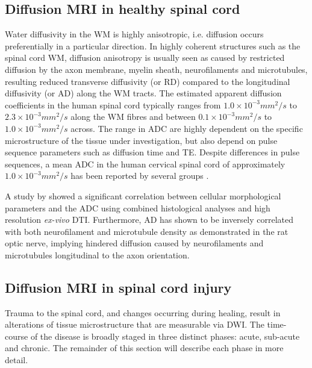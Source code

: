 \subsection{Diffusion MRI in healthy spinal cord}
Water diffusivity in the \gls{WM} is highly anisotropic, i.e. diffusion occurs preferentially in a particular direction. In highly coherent structures such as the spinal cord WM, diffusion anisotropy is usually seen as caused by restricted diffusion by the axon membrane, myelin sheath, neurofilaments and microtubules, resulting reduced transverse diffusivity (or \gls{RD}) compared to the longitudinal diffusivity (or \gls{AD}) along the \gls{WM} tracts. The estimated apparent diffusion coefficients in the human spinal cord typically ranges from $1.0 \times 10^{-3} mm^2/s$ to $2.3 \times 10^{-3} mm^{2}/s$ along the \gls{WM} fibres and between  $0.1 \times 10^{-3} mm^2/s$ to $1.0 \times 10^{-3} mm^{2}/s$ across. The range in \gls{ADC} are highly dependent on the specific microstructure of the tissue under investigation, but also depend on pulse sequence parameters such as diffusion time and \gls{TE}. Despite differences in pulse sequences, a mean \gls{ADC} in the human cervical spinal cord of approximately  $1.0 \times 10^{-3} mm^2/s$ has been reported by several groups \citep{Wheeler-Kingshott:2002,Ellingson:2007}.



A study by \citet{Schwartz:2005} showed a significant correlation between cellular morphological parameters and the \gls{ADC} using combined histological analyses and high resolution \emph{ex-vivo} \gls{DTI}. Furthermore, \gls{AD} has shown to be inversely correlated with both neurofilament and microtubule density as demonstrated in the rat optic nerve\citep{Kinoshita:1999}, implying hindered diffusion caused by neurofilaments and microtubules longitudinal to the axon orientation. 

\subsection{Diffusion MRI in spinal cord injury}
Trauma to the spinal cord, and changes occurring during healing, result in alterations of tissue microstructure that are measurable via \gls{DWI}. The time-course of the disease is broadly staged in three distinct phases: acute, sub-acute and chronic. The remainder of this section will describe each phase in more detail.  

